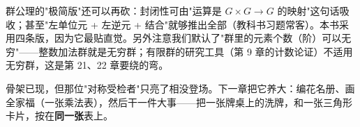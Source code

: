 \begin{chengshi}
群公理的"极简版"还可以再砍：封闭性可由"运算是 $G\times G\to G$ 的映射"这句话吸收；甚至"左单位元 + 左逆元 + 结合"就够推出全部（教科书习题常客）。本书采用四条版，因为它最贴直觉。另外注意我们默认了"群里的元素个数（阶）可以无穷"——整数加法群就是无穷群；有限群的研究工具（第 9 章的计数论证）不适用无穷群，这是第 21、22 章要绕的弯。
\end{chengshi}

骨架已现，但那位"对称受检者"只亮了相没登场。下一章把它养大：编花名册、画全家福（一张乘法表），然后干一件大事——把一张牌桌上的洗牌，和一张三角形卡片，按在\textbf{同一张}表上。
